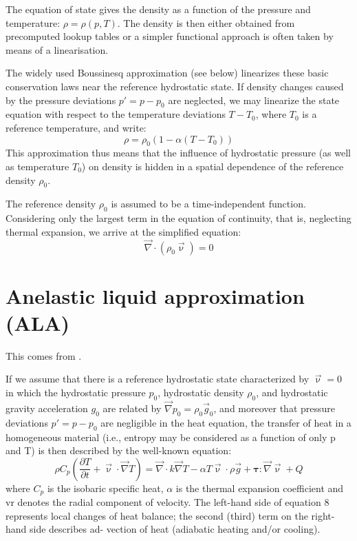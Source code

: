 \documentclass[a4paper,12pt]{article}
\begin{document}
The equation of state gives the density as a function of the
pressure and temperature: $\rho=\rho(p,T)$.
The density is then either obtained from precomputed lookup
tables or a simpler functional approach is often taken
by means of a linearisation.

The widely used Boussinesq approximation (see below) linearizes these
basic conservation laws near the reference hydrostatic state.
If density changes caused by the pressure deviations
$p' = p-p_0$ are neglected, we may linearize the state equation with respect to
the temperature deviations $T-T_0$, where $T_0$ is a reference
temperature, and write:
\[
\rho=\rho_0(1-\alpha(T-T_0))
\]
This approximation thus means that the influence of hydrostatic pressure 
(as well as temperature $T_0$) on density is hidden
in a spatial dependence of the reference density $\rho_0$.

The reference density $\rho_0$ is assumed to be a time-independent function. 
Considering only the largest term in the equation of continuity, that is, 
neglecting thermal expansion, we arrive at the simplified equation:
\[
\vec\nabla\cdot(\rho_0 \vec\upnu) =0
\]


\newpage
\section{Anelastic liquid approximation (ALA)}

This comes from \textcite{mayu07}.

If we assume that there is a reference hydrostatic state characterized 
by $\vec\upnu = 0$ in which the hydrostatic pressure $p_0$, 
hydrostatic density $\rho_0$, and hydrostatic gravity acceleration $g_0$ are
related by $\vec\nabla p_0 = \rho_0 \vec{g}_0$,
and moreover that pressure deviations $p'=p-p_0$
are negligible in the heat equation, the transfer of heat in a homogeneous
material (i.e., entropy may be considered as a function of only
p and T) is then described by the well-known equation:
\[
\rho C_p \left( \frac{\partial T}{\partial t} + \vec \upnu\cdot\vec\nabla T\right)
=  \vec\nabla\cdot k\vec\nabla T  
- \alpha T  \vec\upnu \cdot \rho \vec{g} 
+ {\bm \tau} : \vec\nabla \vec\upnu + Q
\]
where $C_p$ is the isobaric specific heat, $\alpha$ is the thermal expansion
coefficient and vr denotes the radial component of velocity. The
left-hand side of equation 8 represents local changes of heat balance; 
the second (third) term on the right-hand side describes ad-
vection of heat (adiabatic heating and/or cooling).
\end{document}
